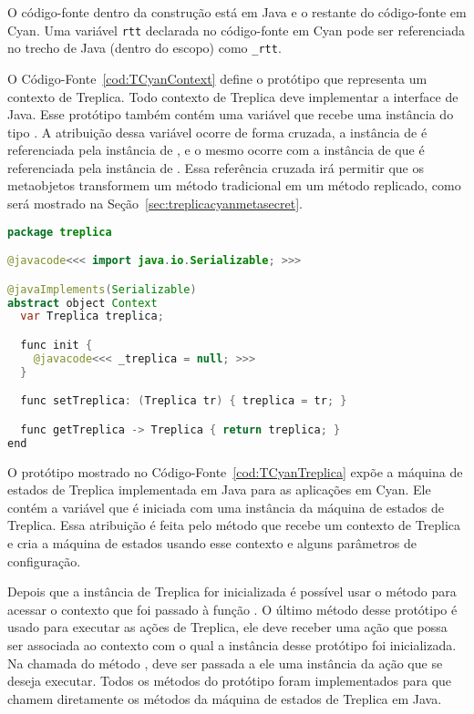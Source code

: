 O código-fonte dentro da construção  está em Java e o restante do código-fonte em Cyan. Uma variável \texttt{rtt} declarada no código-fonte em Cyan pode ser referenciada no trecho de Java (dentro do escopo) como \texttt{\_rtt}. 

O Código-Fonte~\ref{cod:TCyanContext} define o protótipo  que representa um contexto de Treplica. Todo contexto de Treplica deve implementar a interface  de Java. Esse protótipo também contém uma variável que recebe uma instância do tipo . A atribuição dessa variável ocorre de forma cruzada, a instância de  é referenciada pela instância de , e o mesmo ocorre com a instância de  que é referenciada pela instância de . Essa referência cruzada irá permitir que os metaobjetos transformem um método tradicional em um método replicado, como será mostrado na Seção~\ref{sec:treplicacyanmetasecret}.

\begin{lstlisting}[language=Java, caption={Código Fonte de \textbf{Context}}, label={cod:TCyanContext}]
package treplica

@javacode<<< import java.io.Serializable; >>>

@javaImplements(Serializable)
abstract object Context
  var Treplica treplica;

  func init {
    @javacode<<< _treplica = null; >>>
  }

  func setTreplica: (Treplica tr) { treplica = tr; }

  func getTreplica -> Treplica { return treplica; }
end
\end{lstlisting}

O protótipo  mostrado no Código-Fonte~\ref{cod:TCyanTreplica} expõe a máquina de estados de Treplica implementada em Java para as aplicações em Cyan. Ele contém a variável  que é iniciada com uma instância da máquina de estados de Treplica. Essa atribuição é feita pelo método  que recebe um contexto de Treplica e cria a máquina de estados usando esse contexto e alguns parâmetros de configuração. 

Depois que a instância de Treplica for inicializada é possível usar o método  para acessar o contexto que foi passado à função . O último método desse protótipo é usado para executar as ações de Treplica, ele deve receber uma ação que possa ser associada ao contexto com o qual a instância desse protótipo foi inicializada. Na chamada do método , deve ser passada a ele uma instância da ação que se deseja executar. Todos os métodos do protótipo  foram implementados para que chamem diretamente os métodos da máquina de estados de Treplica em Java.

